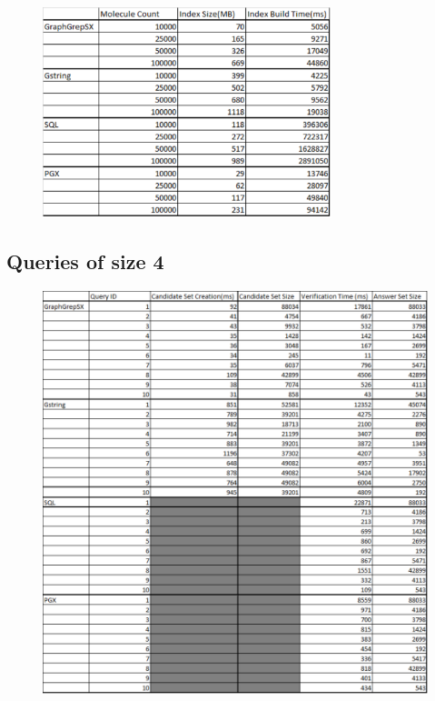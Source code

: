 \documentclass[12pt,a4paper]{report}
\begin{document}
\begin{figure}[h]
	\centering
	\includegraphics[width=0.75\textwidth]{../img/indexBuilding.pdf}
\end{figure}

\newpage
\subsection*{Queries of size 4}

\begin{figure}[h]
	\centering
	\includegraphics[width=1\textwidth]{../img/q4.pdf}
\end{figure}
\end{document}
